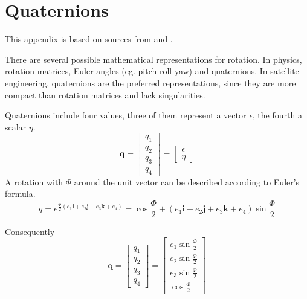 \chapter{Quaternions } \label{chap:A}
This appendix is based on sources from \cite{SADC} and \cite{Kui}.

There are several possible mathematical representations for rotation. In physics, rotation matrices, Euler angles (eg. pitch-roll-yaw) and quaternions. In satellite engineering, quaternions are the preferred representations, since they are more compact than rotation matrices and lack singularities.

Quaternions include four values, three of them represent a vector \textbf{$\epsilon$}, the fourth a scalar $\eta$. 
\begin{equation}
\textbf{q} =
\left[ 
\begin{array}{cccc}
q_1 \\
q_2 \\  
q_3 \\
q_4 
\end{array}
\right] 
= 
\left[ 
\begin{array}{cccc}
\textbf{$\epsilon$} \\
\eta
\end{array}
\right] 
\end{equation}
A rotation with $\Phi$ around the unit vector can be described according to Euler's formula.
\begin{equation}
q = e^{\frac{\Phi}{2} (e_1 \textbf{i}+ e_2 \textbf{j} + e_3 \textbf{k} + e_4)} = \cos \frac{\Phi}{2} + (e_1 \textbf{i}+ e_2 \textbf{j} + e_3 \textbf{k} +e_4) \sin \frac{\Phi}{2}
\end{equation}

Consequently 
\begin{equation}
\textbf{q} =
\left[ 
\begin{array}{cccc}
q_1 \\
q_2 \\  
q_3 \\
q_4 
\end{array}
\right] 
= 
\left[ 
\begin{array}{cccc}
e_1  \sin \frac{\Phi}{2} \\
e_2  \sin \frac{\Phi}{2} \\  
e_3  \sin \frac{\Phi}{2} \\
\cos \frac{\Phi}{2} 
\end{array}
\right] 
\end{equation}

